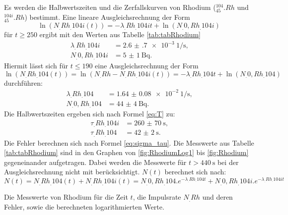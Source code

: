 Es werden die Halbwertszeiten und die Zerfallskurven von Rhodium ($^{104}_{45}.{Rh}$ und $^{104i}_{45}.{Rh}$) bestimmt.
Eine lineare Ausgleichsrechnung der Form 
\begin{equation}
\ln(N_.{Rh_.{104i}}(t))=-\lambda_.{Rh_.{104i}} t+\ln(N_.{0,Rh_.{104i}})\label{eq:Ausgleich2}
\end{equation}
für $t\geq 250$ ergibt mit den Werten aus Tabelle \ref{tab:tabRhodium}
\begin{align*}
\lambda_.{Rh_.{104i}} 	&= \SI{2.6(7)e-3}{1\per\second}\text{,}\\
N_.{0,Rh_.{104i}} 		&= \SI{5(1)}{\becquerel}\text{.}
\end{align*}
Hiermit lässt sich für $t\leq 190$ eine Ausgleichsrechnung der Form 
\begin{equation}
\ln(N_.{Rh_.{104}}(t))=\ln(N_.{Rh}-N_.{Rh_.{104i}}(t))=-\lambda_.{Rh_.{104}} t+\ln(N_.{0,Rh_.{104}})\label{eq:Ausgleich1}
\end{equation}
durchführen:
\begin{align*}
\lambda_.{Rh_.{104}} 	&= \SI{1.64(8)e-2}{1\per\second}\text{,}\\
N_.{0,Rh_.{104}} 		&= \SI{44(4)}{\becquerel}\text{.}
\end{align*}
Die Halbwertszeiten ergeben sich nach Formel \eqref{eq:T} zu:
\begin{align*}
\tau_.{Rh_.{104i}} 	&= \SI{260(70)}{\second}\text{,}\\
\tau_.{Rh_.{104}} &= \SI{42(2)}{\second}\text{.}
\end{align*}
Die Fehler berechnen sich nach Formel \eqref{eq:sigma_tau}. Die Messwerte aus Tabelle \ref{tab:tabRhodium} sind in den Graphen von \ref{fig:RhodiumLog1} bis \ref{fig:Rhodium} gegeneinander aufgetragen. Dabei werden die Messwerte für $t>\SI{440}{\second}$ bei der Ausgleichsrechnung nicht mit berücksichtigt. $N(t)$ berechnet sich nach:
\begin{equation*}
N(t)=N_.{Rh_.{104}}(t)+N_.{Rh_.{104i}}(t)=N_.{0,Rh_.{104}}.e^{-\lambda_.{Rh_.{104}} t}+N_.{0,Rh_.{104i}}.e^{-\lambda_.{Rh_.{104i}} t}
\end{equation*}

\begin{table}
	\centering
	\caption{Die Messwerte von Rhodium für die Zeit $t$, die Impulsrate $N_.{Rh}$ und deren Fehler, sowie die berechneten logarithmierten Werte.}
	
	\label{tab:tabRhodium}
\end{table}

\begin{table}
	\centering
	
\end{table}

